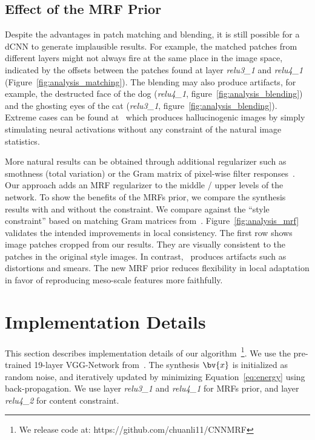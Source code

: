 \documentclass[10pt,twocolumn,letterpaper]{article}
\begin{document}
\subsection{Effect of the MRF Prior}
Despite the advantages in patch matching and blending, it is still possible for a dCNN to generate implausible results. For example, the matched patches from different layers might not always fire at the same place in the image space, indicated by the offsets between the patches found at layer 
\textit{relu3\_1} and \textit{relu4\_1} (Figure~\ref{fig:analysis_matching}). The blending may also produce artifacts, for example, the destructed face of the dog (\textit{relu4\_1}, figure~\ref{fig:analysis_blending}) and the ghosting eyes of the cat (\textit{relu3\_1}, figure~\ref{fig:analysis_blending}). Extreme cases can be found at~\cite{Mordvintsev15} which produces hallucinogenic images by simply stimulating neural activations without any constraint of the natural image statistics.

More natural results can be obtained through additional regularizer such as smothness (total variation) or the Gram matrix of pixel-wise filter responses~\cite{Mahendran15,Gatys15}.
Our approach adds an MRF regularizer to the middle / upper levels of the network.
To show the benefits of the MRFs prior, we compare the synthesis results with and without the constraint. We compare against the ``style constraint'' based on matching Gram matrices from~\cite{Gatys15}. Figure~\ref{fig:analysis_mrf} validates the intended improvements in local consistency. The first row shows image patches cropped from our results. They are visually consistent to the patches in the original style images. In contrast,~\cite{Gatys15} produces artifacts such as distortions and smears. The new MRF prior reduces flexibility in local adaptation in favor of reproducing meso-scale features more faithfully.

\section{Implementation Details}
This section describes implementation details of our algorithm~\footnote{We release code at: https://github.com/chuanli11/CNNMRF}. We use the pre-trained 19-layer VGG-Network from~\cite{Simonyan14c}. The synthesis $\bv{x}$ is initialized as random noise, and iteratively updated by minimizing Equation~\ref{eq:energy} using back-propagation. We use layer \textit{relu3\_1} and \textit{relu4\_1} for MRFs prior, and layer \textit{relu4\_2} for content constraint. 
\end{document}
